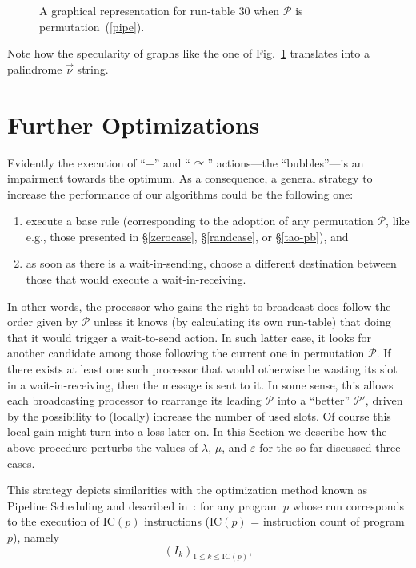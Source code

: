 \documentclass{elsart}
\begin{document}
\begin{figure}
\centerline{}
\caption{A graphical representation for run-table 30 when $\mathcal P$ is
permutation~(\ref{pipe}).}\label{s30}
\end{figure}

Note how the specularity of graphs like the one of Fig.~\ref{s30} translates
into a palindrome $\vec\nu$ string.




\section{Further Optimizations}\label{opt}
Evidently the execution of ``$-$'' and ``$\curvearrowright$'' actions---the
``bubbles''---is an impairment towards the optimum.
As a consequence, a general strategy to increase the
performance of our algorithms could be the following one:
\begin{enumerate}
\item execute a base rule (corresponding to the adoption of any
permutation $\mathcal P$, like e.g., those presented in \S\ref{zerocase},
\S\ref{randcase}, or \S\ref{tao-pb}), and
\item as soon as there is a wait-in-sending, choose a different
destination between those that would execute a wait-in-receiving.
\end{enumerate}

In other words, the processor who gains the right to broadcast
does follow the order given by $\mathcal P$ unless it knows
(by calculating its own run-table) that doing that it would trigger
a wait-to-send action. In such latter case, it looks for another
candidate among those following the current one in permutation $\mathcal P$.
If there exists at least one such processor that would otherwise
be wasting its slot in a wait-in-receiving, then the message
is sent to it. In some sense, this allows each 
broadcasting processor to rearrange its leading $\mathcal P$
into a ``better'' $\mathcal{P}'$, driven by the possibility
to (locally) increase the number of used slots. Of course
this local gain might turn into a loss later on. In this
Section we describe how the above procedure perturbs
the values of $\lambda$, $\mu$, and $\varepsilon$ for the
so far discussed three cases.

This strategy depicts similarities with the optimization method
known as Pipeline Scheduling and described in~\cite{PaHe96}:
for any program $p$ whose run corresponds to the execution of $\mathrm{IC}(p)$ instructions
($\mathrm{IC}(p)$ = instruction count of program $p$), namely
\begin{equation}\label{Ik}
(I_k)_{1\leq k\leq \mathrm{IC}(p)},
\end{equation}
\end{document}
